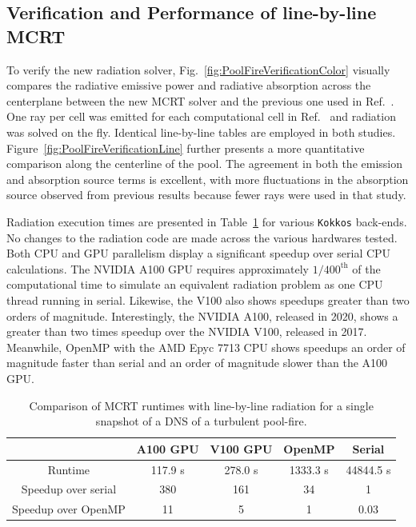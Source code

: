 \subsection{Verification and Performance of line-by-line MCRT}
To verify the new radiation solver,
Fig.~\ref{fig:PoolFireVerificationColor} visually compares the radiative emissive power and radiative absorption across the centerplane between the new MCRT solver and the previous one used in Ref.~\cite{Wu2020DetailedFire}. One ray per cell was emitted for each computational cell in Ref.~\cite{Wu2020DetailedFire} and radiation was solved on the fly. Identical line-by-line tables are employed in both studies. 
Figure~\ref{fig:PoolFireVerificationLine} further presents a more quantitative comparison along the centerline of the pool. The agreement in both the emission and absorption source terms is excellent, with more fluctuations in the absorption source observed from previous results because fewer rays were used in that study. 

Radiation execution times are presented in Table~\ref{table:PoolFireRuntimes} for various \texttt{Kokkos} back-ends. No changes to the radiation code are made across the various hardwares tested. Both CPU and GPU parallelism display a significant speedup over serial CPU calculations.
The NVIDIA A100 GPU requires approximately $1/400^{\text{th}}$ of the computational time to simulate an equivalent radiation problem as one CPU thread running in serial. Likewise, the V100 also shows speedups greater than two orders of magnitude. Interestingly, the NVIDIA A100, released in 2020, shows a greater than two times speedup over the NVIDIA V100, released in 2017. Meanwhile, OpenMP with the AMD Epyc 7713 CPU shows speedups an order of magnitude faster than serial and an order of magnitude slower than the A100 GPU.

\begin{table}
\caption{Comparison of MCRT runtimes with line-by-line radiation for a single snapshot of a DNS of a turbulent pool-fire.}
\label{table:PoolFireRuntimes}
\centering
\begin{tabular}{c c c c c} 
 \hline
 ~ & A100 GPU & V100 GPU & OpenMP & Serial \\ [0.5ex] 
 \hline
 Runtime & 117.9 s & 278.0 s & 1333.3 s & 44844.5 s \\ 
 Speedup over serial & 380 & 161 & 34 & 1 \\
 Speedup over OpenMP & 11 & 5 & 1 & 0.03 \\
 \hline
\end{tabular}
\end{table}

